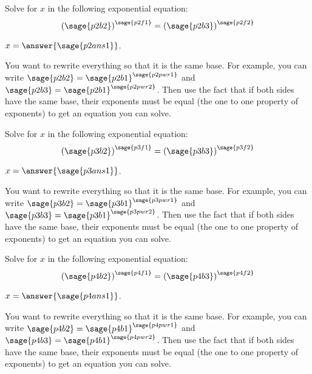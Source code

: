 \documentclass{ximera}
\begin{document}
\begin{problem}
    Solve for $x$ in the following exponential equation:
    \[
        \left(\sage{p2b2}\right)^{\sage{p2f1}} = \left(\sage{p2b3}\right)^{\sage{p2f2}}
    \]

    $x = \answer{\sage{p2ans1}}$.
    \begin{feedback}
        You want to rewrite everything so that it is the same base. For example, you can write $\sage{p2b2} = \sage{p2b1}^{\sage{p2pwr1}}$ and $\sage{p2b3} = \sage{p2b1}^{\sage{p2pwr2}}$. Then use the fact that if both sides have the same base, their exponents must be equal (the one to one property of exponents) to get an equation you can solve. 
    \end{feedback}
\end{problem}


\begin{problem}
    Solve for $x$ in the following exponential equation:
    \[
        \left(\sage{p3b2}\right)^{\sage{p3f1}} = \left(\sage{p3b3}\right)^{\sage{p3f2}}
    \]

    $x = \answer{\sage{p3ans1}}$.
    \begin{feedback}
        You want to rewrite everything so that it is the same base. For example, you can write $\sage{p3b2} = \sage{p3b1}^{\sage{p3pwr1}}$ and $\sage{p3b3} = \sage{p3b1}^{\sage{p3pwr2}}$. Then use the fact that if both sides have the same base, their exponents must be equal (the one to one property of exponents) to get an equation you can solve. 
    \end{feedback}
\end{problem}


\begin{problem}
    Solve for $x$ in the following exponential equation:
    \[
        \left(\sage{p4b2}\right)^{\sage{p4f1}} = \left(\sage{p4b3}\right)^{\sage{p4f2}}
    \]

    $x = \answer{\sage{p4ans1}}$.
    \begin{feedback}
        You want to rewrite everything so that it is the same base. For example, you can write $\sage{p4b2} = \sage{p4b1}^{\sage{p4pwr1}}$ and $\sage{p4b3} = \sage{p4b1}^{\sage{p4pwr2}}$. Then use the fact that if both sides have the same base, their exponents must be equal (the one to one property of exponents) to get an equation you can solve. 
    \end{feedback}
\end{problem}
\end{document}

